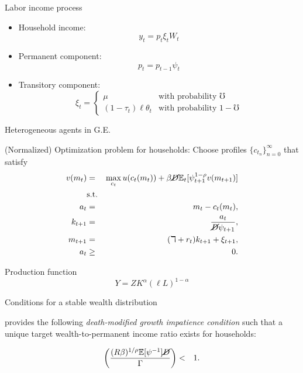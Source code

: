 \documentclass{beamer}
\begin{document}
\small
\begin{frame}{Labor income process}

\begin{itemize}
\item Household income: $$y_t = p_t \xi_t W_t$$
\item Permanent component: $$p_t = p_{t-1} \psi_t$$
\item Transitory component: $$\xi_t =
    \begin{cases}
       \mu & \text{with probability $\mho$} \\
      (1-\tau_t) \ell \theta_t & \text{with probability $1-\mho$}
   \end{cases}$$
\end{itemize}

\end{frame}

\footnotesize
\begin{frame}{Heterogeneous agents in G.E.}

(Normalized) Optimization problem for households: Choose profiles $\{c_{t_n}\}_{n=0}^{\infty}$ that satisfy
 \begin{eqnarray*}
  v(m_t) &=& \max_{c_t} u(c_t(m_t)) + \beta \cancel{D} \mathbb{E}_{t}[\psi_{t+1}^{1-\rho}v(m_{t+1})] \\
  &\text{s.t.}& \\
  a_t &=& m_t - c_t(m_t), \\
  k_{t+1} &=& \frac{a_t}{\cancel{D}\psi_{t+1}}, \\
  m_{t+1} &=& (\daleth + r_t)k_{t+1} + \xi_{t+1}, \\
  a_t &\geq& 0.
\end{eqnarray*}

Production function $$Y = Z K^{\alpha} (\ell L)^{1-\alpha}$$ 

\end{frame}


\begin{frame}{Conditions for a stable wealth distribution}

\cite{Carroll2019bst} provides the following \textit{death-modified growth impatience condition} such that a unique target wealth-to-permanent income ratio exists for households:

\begin{eqnarray*}
\left(\frac{(R \beta)^{1/ \rho}\mathbb{E}[\psi^{-1}]\cancel{D}}{\Gamma}\right) & < & 1.
\end{eqnarray*} 

\end{frame}
\end{document}
